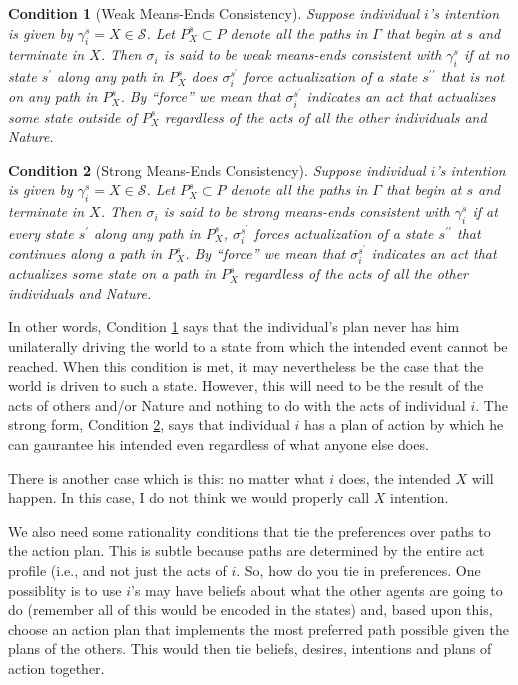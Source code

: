 \documentclass[
11pt,
titlepage,
reqno,
]{article}%
\newtheorem{condition}{Condition}
\theoremstyle{definition}
\begin{document}
	\begin{condition}[Weak Means-Ends Consistency]\label{cond:weak M-E}
		Suppose individual $i$'s intention is given by $\gamma_i^s=X\in\mathcal{S}$. 
		Let $P^s_X\subset P$ denote all the paths in $\Gamma$ that begin at $s$ and terminate in $X$. 
		Then $\sigma_i$ is said to be \textit{weak means-ends consistent with $\gamma_i^s$} if at no state $s^\prime$ along any path in $P^s_X$ does $\sigma_i^{s^\prime}$ force actualization of a state $s^{\prime\prime}$ that is not on any path in $P^s_X$. 
		By ``force'' we mean that $\sigma_i^{s^\prime}$ indicates an act that actualizes some state outside of $P^s_X$ regardless of the acts of all the other individuals and Nature. 
	\end{condition}
	
	\begin{condition}[Strong Means-Ends Consistency]\label{cond:strong M-E}
		Suppose individual $i$'s intention is given by $\gamma_i^s=X\in\mathcal{S}$. 
		Let $P^s_X\subset P$ denote all the paths in $\Gamma$ that begin at $s$ and terminate in $X$. 
		Then $\sigma_i$ is said to be \textit{strong means-ends consistent with $\gamma_i^s$} if at every state $s^\prime$ along any path in $P^s_X$,  $\sigma_i^{s^\prime}$ forces actualization of a state $s^{\prime\prime}$ that continues along a path in $P^s_X$. 
		By ``force'' we mean that $\sigma_i^{s^\prime}$ indicates an act that actualizes some state on a path in $P^s_X$ regardless of the acts of all the other individuals and Nature. 
	\end{condition}
	
	In other words, Condition \ref{cond:weak M-E} says that the individual's plan never has him unilaterally driving the world to a state from which the intended event cannot be reached. 
	When this condition is met, it may nevertheless be the case that the world is driven to such a state. 
	However, this will need to be the result of the acts of others and/or Nature and nothing to do with the acts of individual $i$. 
	The strong form, Condition \ref{cond:strong M-E}, says that individual $i$ has a plan of action by which he can gaurantee his intended even regardless of what anyone else does.
	
	There is another case which is this: no matter what $i$ does, the intended $X$ will happen. 
	In this case, I do not think we would properly call $X$ intention. 
	
	We also need some rationality conditions that tie the preferences over paths to the action plan. 
	This is subtle because paths are determined by the entire act profile (i.e., and not just the acts of $i$. 
	So, how do you tie in preferences. One possiblity is to use $i$'s may have beliefs about what the other agents are going to do (remember all of this would be encoded in the states) and, based upon this, choose an action plan that implements the most preferred path possible given the plans of the others. 
	This would then tie beliefs, desires, intentions and plans of action together. 
	
\end{document}
